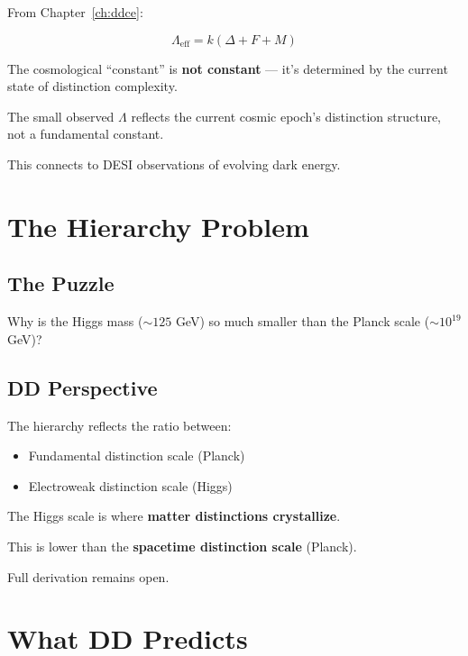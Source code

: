 From Chapter~\ref{ch:ddce}:

\begin{equation}
\Lambda_{\text{eff}} = k(\Delta + F + M)
\end{equation}

The cosmological ``constant'' is \textbf{not constant} — it's determined by the current state of distinction complexity.

\begin{theorem}
The small observed $\Lambda$ reflects the current cosmic epoch's distinction structure, not a fundamental constant.
\end{theorem}

This connects to DESI observations of evolving dark energy.

\section{The Hierarchy Problem}

\subsection{The Puzzle}

Why is the Higgs mass ($\sim 125$ GeV) so much smaller than the Planck scale ($\sim 10^{19}$ GeV)?

\subsection{DD Perspective}

\begin{theorem}
The hierarchy reflects the ratio between:
\begin{itemize}
    \item Fundamental distinction scale (Planck)
    \item Electroweak distinction scale (Higgs)
\end{itemize}
\end{theorem}

The Higgs scale is where \textbf{matter distinctions crystallize}.

This is lower than the \textbf{spacetime distinction scale} (Planck).

Full derivation remains open.

\section{What DD Predicts}

